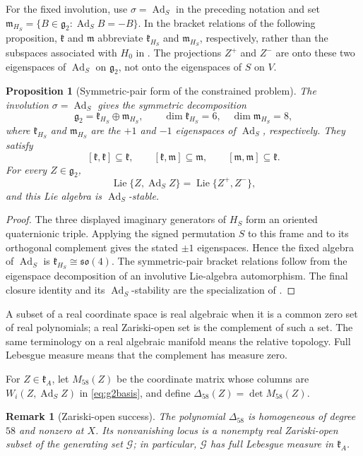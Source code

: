 \documentclass[11pt,a4paper]{article}
\newtheorem{proposition}[proposition]{Proposition}
\newtheorem{remark}[remark]{Remark}
\newcommand{\gtwo}{\mathfrak g_2}
\newcommand{\Lie}{\operatorname{Lie}}
\newcommand{\Ad}{\operatorname{Ad}}
\begin{document}
For the fixed involution, use $\sigma=\Ad_S$ in the preceding notation and set
$\mathfrak m_{H_S}=\{B\in\mathfrak g_2:\Ad_SB=-B\}$.
In the bracket relations of the following proposition, $\mathfrak k$ and $\mathfrak m$ abbreviate $\mathfrak k_{H_S}$ and $\mathfrak m_{H_S}$, respectively, rather than the subspaces associated with $H_0$ in .  The projections $Z^+$ and $Z^-$ are onto these two eigenspaces of $\operatorname{Ad}_S$ on $\mathfrak g_2$, not onto the eigenspaces of $S$ on $V$.

\begin{proposition}[Symmetric-pair form of the constrained problem]
\label{prop:symmetric-switch}
The involution $\sigma=\Ad_S$ gives the symmetric decomposition
\[
\gtwo=\mathfrak k_{H_S}\oplus\mathfrak m_{H_S},
\qquad \dim\mathfrak k_{H_S}=6,
\quad \dim\mathfrak m_{H_S}=8,
\]
where $\mathfrak k_{H_S}$ and $\mathfrak m_{H_S}$ are the $+1$ and $-1$ eigenspaces of $\Ad_S$, respectively.  They satisfy
\[
[\mathfrak k,\mathfrak k]\subseteq\mathfrak k,
\qquad [\mathfrak k,\mathfrak m]\subseteq\mathfrak m,
\qquad [\mathfrak m,\mathfrak m]\subseteq\mathfrak k.
\]
For every $Z\in\mathfrak g_2$,
\[
\Lie\{Z,\Ad_SZ\}=\Lie\{Z^+,Z^-\},
\]
and this Lie algebra is $\Ad_S$-stable.
\end{proposition}

\begin{proof}
The three displayed imaginary generators of $H_S$ form an oriented quaternionic triple.  Applying the signed permutation $S$ to this frame and to its orthogonal complement gives the stated $\pm1$ eigenspaces.  Hence the fixed algebra of $\Ad_S$ is $\mathfrak k_{H_S}\cong\mathfrak{so}(4)$.  The symmetric-pair bracket relations follow from the eigenspace decomposition of an involutive Lie-algebra automorphism.  The final closure identity and its $\Ad_S$-stability are the specialization of .
\end{proof}

A subset of a real coordinate space is real algebraic when it is a common zero set of real polynomials; a real Zariski-open set is the complement of such a set.  The same terminology on a real algebraic manifold means the relative topology.  Full Lebesgue measure means that the complement has measure zero.

For $Z\in\mathfrak k_A$, let $M_{58}(Z)$ be the coordinate matrix whose columns are
$W_i(Z,\Ad_SZ)$ in \eqref{eq:g2basis}, and define $\Delta_{58}(Z)=\det M_{58}(Z)$.

\begin{remark}[Zariski-open success]
\label{thm:generic}
The polynomial $\Delta_{58}$ is homogeneous of degree $58$ and nonzero at $X$.
Its nonvanishing locus is a nonempty real Zariski-open subset of the generating set
$\mathcal G$; in particular, $\mathcal G$ has full Lebesgue measure in $\mathfrak k_A$.
\end{remark}
\end{document}
